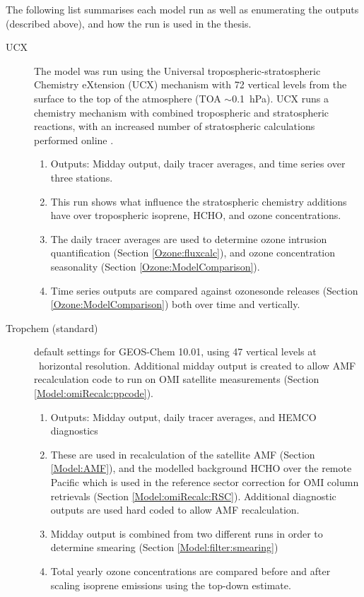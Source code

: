       The following list summarises each model run as well as enumerating the outputs (described above), and how the run is used in the thesis.
      \begin{description}
        \item[UCX]%
          The model was run using the Universal tropospheric-stratospheric Chemistry eXtension (UCX) mechanism with 72 vertical levels from the surface to the top of the atmosphere (TOA $\sim$0.1~hPa).
          UCX runs a chemistry mechanism with combined tropospheric and stratospheric reactions, with an increased number of stratospheric calculations performed online \parencite{Eastham2014}.
          \begin{enumerate}
            \item Outputs: Midday output, daily tracer averages, and time series over three stations.
            \item This run shows what influence the stratospheric chemistry additions have over tropospheric isoprene, HCHO, and ozone concentrations.
            \item The daily tracer averages are used to determine ozone intrusion quantification (Section \ref{Ozone:fluxcalc}), and ozone concentration seasonality (Section \ref{Ozone:ModelComparison}).
            \item Time series outputs are compared against ozonesonde releases (Section \ref{Ozone:ModelComparison}) both over time and vertically.
          \end{enumerate}
        
        \item [Tropchem (standard)]%
          default settings for GEOS-Chem 10.01, using 47 vertical levels at \lowhr ~horizontal resolution.
          Additional midday output is created to allow AMF recalculation code to run on OMI satellite measurements (Section \ref{Model:omiRecalc:ppcode}).
          \begin{enumerate}
            \item Outputs: Midday output, daily tracer averages, and HEMCO diagnostics
            \item These are used in recalculation of the satellite AMF (Section \ref{Model:AMF}), and the modelled background HCHO over the remote Pacific which is used in the reference sector correction for OMI column retrievals (Section \ref{Model:omiRecalc:RSC}).
            Additional diagnostic outputs are used hard coded to allow AMF recalculation.
            \item Midday output is combined from two different runs in order to determine smearing (Section \ref{Model:filter:smearing})
            \item Total yearly ozone concentrations are compared before and after scaling isoprene emissions using the top-down estimate.
          \end{enumerate}
        

\end{description}
